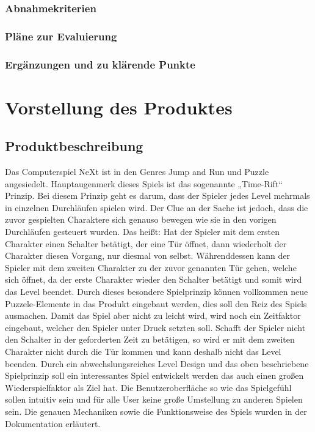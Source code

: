 \subsection{Abnahmekriterien}
\subsection{Pläne zur Evaluierung}
\subsection{Ergänzungen und zu klärende Punkte}
\chapter{Vorstellung des Produktes}
\section{Produktbeschreibung}
Das Computerspiel NeXt ist in den Genres Jump and Run und Puzzle angesiedelt. Hauptaugenmerk dieses Spiels ist das sogenannte „Time-Rift“ Prinzip. Bei diesem Prinzip geht es darum, dass der Spieler jedes Level mehrmals in einzelnen Durchläufen spielen wird. Der Clue an der Sache ist jedoch, dass die zuvor gespielten Charaktere sich genauso bewegen wie sie in den vorigen Durchläufen gesteuert wurden. Das heißt: Hat der Spieler mit dem ersten Charakter einen Schalter betätigt, der eine Tür öffnet, dann wiederholt der Charakter diesen Vorgang, nur diesmal von selbst. Währenddessen kann der Spieler mit dem zweiten Charakter zu der zuvor genannten Tür gehen, welche sich öffnet, da der erste Charakter wieder den Schalter betätigt und somit wird das Level beendet. Durch dieses besondere Spielprinzip können vollkommen neue Puzzele-Elemente in das Produkt eingebaut werden, dies soll den Reiz des Spiels ausmachen.  Damit das Spiel aber nicht zu leicht wird, wird noch ein Zeitfaktor eingebaut, welcher den Spieler unter Druck setzten soll. Schafft der Spieler nicht den Schalter in der geforderten Zeit zu betätigen, so wird er mit dem zweiten Charakter nicht durch die Tür kommen und kann deshalb nicht das Level beenden. Durch ein abwechslungsreiches Level Design und das oben beschriebene Spielprinzip soll ein interessantes Spiel entwickelt werden das auch einen großen Wiederspielfaktor als Ziel hat. Die Benutzeroberfläche so wie das Spielgefühl sollen intuitiv sein und für alle User keine große Umstellung zu anderen Spielen sein. Die genauen Mechaniken sowie die Funktionsweise des Spiels wurden in der Dokumentation erläutert.  
